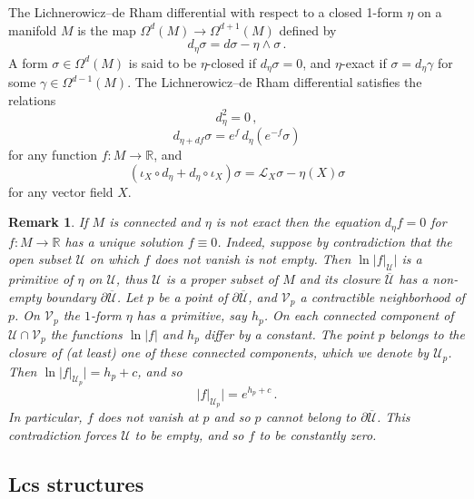 \documentclass{amsart}
\newtheorem{remark}[thm]{Remark}
\theoremstyle{remark}
\begin{document}
The Lichnerowicz--de Rham differential
with respect to a closed 1-form $\eta$ on a manifold $M$
is the map $\Omega^d (M) \rightarrow \Omega^{d+1}(M)$
defined by
\[
d_{\eta} \sigma = d\sigma - \eta \wedge \sigma \,.
\]
A form $\sigma \in \Omega^d(M)$ is said to be $\eta$-closed
if $d_{\eta}\sigma = 0$,
and $\eta$-exact if $\sigma = d_{\eta}\gamma$
for some $\gamma \in \Omega^{d-1}(M)$.
The Lichnerowicz--de Rham differential
satisfies the relations
\[
d_{\eta}^2 = 0 \,,
\]
\[
d_{\eta + df} \sigma = e^f \, d_{\eta} (e^{-f} \sigma)
\]
for any function $f: M \rightarrow \mathbb{R}$,
and
$$
(\iota_X \circ d_{\eta} + d_{\eta} \circ \iota_X) \sigma
= \mathcal{L}_X \sigma - \eta(X) \sigma
$$
for any vector field $X$.

\begin{remark}\label{remark: unique solution}
If $M$ is connected and $\eta$ is not exact
then the equation $d_\eta f = 0$
for $f: M \rightarrow \mathbb{R}$
has a unique solution $f \equiv 0$.
Indeed,
suppose by contradiction that the open subset $\mathcal{U}$
on which $f$ does not vanish is not empty.
Then $\ln |f|_\mathcal{U}|$ is a primitive of $\eta$ on $\mathcal{U}$,
thus $\mathcal{U}$ is a proper subset of $M$
and its closure $\overline{\mathcal{U}}$
has a non-empty boundary $\partial \overline{\mathcal{U}}$.
Let $p$ be a point of $\partial \overline{\mathcal{U}}$,
and $\mathcal{V}_p$ a contractible neighborhood of $p$.
On $\mathcal{V}_p$ the $1$-form $\eta$ has a primitive, say $h_p$.
On each connected component of $\mathcal{U} \cap \mathcal{V}_p$
the functions $\ln|f|$ and $h_p$ differ by a constant.
The point $p$ belongs to the closure
of (at least) one of these connected components,
which we denote by ${\mathcal U}_p$.
Then $\ln|f|_{{\mathcal U}_p}| = h_p + c$,
and so
$$
|f|_{{\mathcal U}_p}| = e^{h_p + c} \,.
$$
In particular,
$f$ does not vanish at $p$
and so $p$ cannot belong to $\partial \overline{\mathcal{U}}$.
This contradiction
forces $\mathcal{U}$ to be empty,
and so $f$ to be constantly zero.
\end{remark}


\subsection{Lcs structures}
\end{document}
